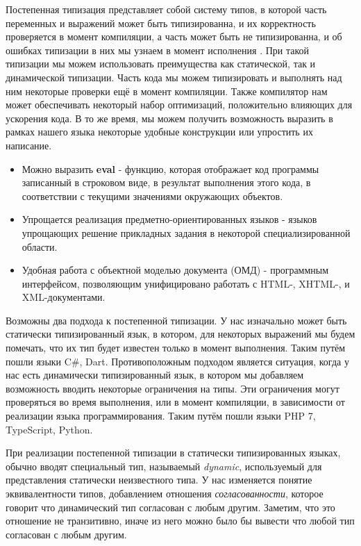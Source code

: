 Постепенная типизация представляет собой систему типов, в которой часть переменных и выражений может быть типизированна, и их корректность проверяется в момент компиляции, а часть может быть не типизированна, и об ошибках типизации в них мы узнаем в момент исполнения \cite{gradual:siek2006gradual} \cite{gradual:siek2007gradual}. При такой типизации мы можем использовать преимущества как статической, так и динамической типизации. Часть кода мы можем типизировать и выполнять над ним некоторые проверки ещё в момент компиляции. Также компилятор нам может обеспечивать некоторый набор оптимизаций, положительно влияющих для ускорения кода. В то же время, мы можем получить возможность выразить в рамках нашего языка некоторые удобные конструкции или упростить их написание.

\begin{itemize}
    \item Можно выразить \textbf{eval} - функцию, которая отображает код программы записанный в строковом виде, в результат выполнения этого кода, в соответствии с текущими значениями окружающих объектов.
    \item Упрощается реализация предметно-ориентированных языков - языков упрощающих решение прикладных задания в некоторой специализированной области.
    \item Удобная работа с объектной моделью документа (ОМД) - программным интерфейсом, позволяющим унифицировано работать с HTML-, XHTML-, и XML-документами.
\end{itemize}

Возможны два подхода к постепенной типизации. У нас изначально может быть статически типизированный язык, в котором, для некоторых выражений мы будем помечать, что их тип будет известен только в момент выполнения. Таким путём пошли языки C{\#}, Dart. Противоположным подходом является ситуация, когда у нас есть динамически типизированный язык, в котором мы добавляем возможность вводить некоторые ограничения на типы. Эти ограничения могут проверяться во время выполнения, или в момент компиляции, в зависимости от реализации языка программирования. Таким путём пошли языки PHP 7, TypeScript, Python.

При реализации постепенной типизации в статически типизированных языках, обычно вводят специальный тип, называемый \textit{dynamic}, используемый для представления статически неизвестного типа. У нас изменяется понятие эквивалентности типов, добавлением отношения \textit{согласованности}, которое говорит что динамический тип согласован с любым другим. Заметим, что это отношение не транзитивно, иначе из него можно было бы вывести что любой тип согласован с любым другим.


